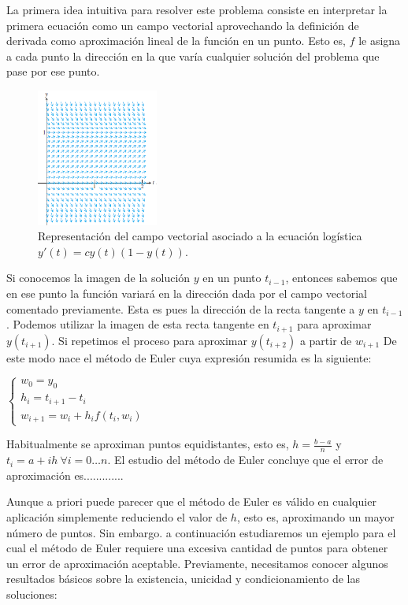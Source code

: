\documentclass{article}
\theoremstyle{theorem-style}  %
\theoremstyle{definition}
\theoremstyle{example-style}
\begin{document}
	La primera idea intuitiva para resolver este problema consiste en interpretar la primera ecuación como un campo vectorial aprovechando la definición de derivada como aproximación lineal de la función en un punto. Esto es, $f$ le asigna a cada punto la dirección en la que varía cualquier solución del problema que pase por ese punto.

	\begin{figure}[h]
		\centering
		\includegraphics[width=4cm]{./Images/interpret-pvi.png}
		\caption{Representación del campo vectorial asociado a la ecuación logística $y'(t) = c y(t) (1 - y(t))$.} 
		\label{fig:interpret-pvi}
	\end{figure}

	Si conocemos la imagen de la solución $y$ en un punto $t_{i-1}$, entonces sabemos que en ese punto la función variará en la dirección dada por el campo vectorial comentado previamente. Esta es pues la dirección de la recta tangente a $y$ en $t_{i-1}$. Podemos utilizar la imagen de esta recta tangente en $t_{i+1}$ para aproximar $y(t_{i+1})$. Si repetimos el proceso para aproximar $y(t_{i+2})$ a partir de $w_{i+1}$ De este modo nace el método de Euler cuya expresión resumida es la siguiente:

	\begin{center}
		$\begin{cases}
		w_0=y_0 \\
		h_{i} = t_{i+1} - t_i \\
		w_{i+1} = w_i + h_{i} f(t_i,w_i)
		\end{cases}$
	\end{center}
	
	Habitualmente se aproximan puntos equidistantes, esto es, $h = \frac{b-a}{n}$ y $t_i = a + ih \ \forall i = 0 \ldots n$. El estudio del método de Euler concluye que el error de aproximación es.............
	
	Aunque a priori puede parecer que el método de Euler es válido en cualquier aplicación simplemente reduciendo el valor de $h$, esto es, aproximando un mayor número de puntos. Sin embargo. a continuación estudiaremos un ejemplo para el cual el método de Euler requiere una excesiva cantidad de puntos para obtener un error de aproximación aceptable. Previamente, necesitamos conocer algunos resultados básicos sobre la existencia, unicidad y condicionamiento de las soluciones:
	
\end{document}
